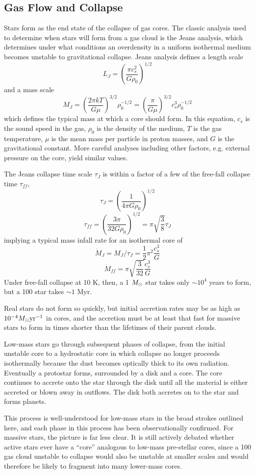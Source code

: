 \subsection{Gas Flow and Collapse}
Stars form as the end state of the collapse of gas cores.  The classic analysis
used to determine when stars will form from a gas cloud is the Jeans analysis, which
determines under what conditions an overdensity in a uniform isothermal medium
becomes unstable to gravitational collapse.  Jeans analysis defines a length scale
$$L_J = \left( \frac{\pi c_s^2}{G \rho_0} \right)^{1/2}$$
and a mass scale
$$M_J = \left(\frac{2 \pi k T}{G \mu}\right)^{3/2} \rho_0^{-1/2} = \left(\frac{\pi}{G \mu}\right)^{3/2} c_s^3 \rho_0^{-1/2}$$
which defines the typical mass at which a core should form.  In this equation,
$c_s$ is the sound speed in the gas, $\rho_0$ is the density of the medium, $T$
is the gas temperature, $\mu$ is the mean mass per particle in proton masses, and $G$ is
the gravitational constant.  More careful analyses including other factors,
e.g. external pressure on the core, yield similar values.

The Jeans collapse time scale $\tau_{J}$ is within a factor of a few of the free-fall
collapse time $\tau_{ff}$,
$$\tau_J = \left(\frac{1}{4 \pi G \rho_0}\right)^{1/2}$$
$$\tau_{ff} = \left(\frac{3\pi}{32 G \rho_0}\right)^{1/2} =  \pi\sqrt{\frac{3}{8}} \tau_J$$
implying a typical mass infall rate for an isothermal core of
$$\dot{M}_J = M_J/\tau_J =  \frac{1}{2} \pi^2 \frac{c_s^3}{G}$$
$$\dot{M}_{ff} = \pi \sqrt{\frac{3}{32}} \frac{c_s^3}{G}$$
Under free-fall collapse at 10 K, then, a 1 $M_{\odot}$ star takes only $\sim10^4$
years to form, but a 100 \msun star takes $\sim1$ Myr.

Real stars do not form so quickly, but initial accretion rates may be as high
as $10^{-4} M_{\odot} \textrm{yr}^{-1}$ in cores, and the accretion must be at least that
fast for massive stars to form in times shorter than the lifetimes of their
parent clouds.  

Low-mass stars go through subsequent phases of collapse, from the initial
unstable core to a hydrostatic core in which collapse no longer proceeds
isothermally because the dust becomes optically thick to its own radiation.
Eventually a protostar forms, surrounded by a disk and a core.  The core
continues to accrete onto the star through the disk until all the material is
either accreted or blown away in outflows.  The disk both accretes on to the
star and forms planets.

This process is well-understood for low-mass stars in the broad strokes
outlined here, and each phase in this process has been observationally
confirmed.  For massive stars, the picture is far less clear.  It is still
actively debated whether active stars ever have a ``core'' analogous to 
low-mass pre-stellar cores, since a 100 \msun gas cloud unstable to collapse
would also be unstable at smaller scales and would therefore be likely to fragment
into many lower-mass cores.

